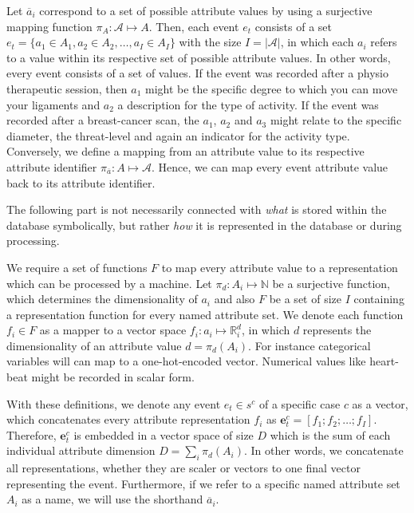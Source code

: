\documentclass[./../../paper.tex]{subfiles}
\begin{document}
Let $\overline{a}_i$ correspond to a set of possible attribute values by using a surjective mapping function $\pi_A : \mathcal{A} \mapsto A$. Then, each event $e_t$ consists of a set $e_t = \{ a_1 \in A_1, a_2 \in A_2, \ldots, a_I \in A_I\}$ with the size $I = |\mathcal{A}|$, in which each $a_i$ refers to a value within its respective set of possible attribute values. In other words, every event consists of a set of values. If the event was recorded after a physio therapeutic session, then $a_1$ might be the specific degree to which you can move your ligaments and $a_2$ a description for the type of activity. If the event was recorded after a breast-cancer scan, the $a_1$, $a_2$ and $a_3$ might relate to the specific diameter, the threat-level and again an indicator for the activity type. 
Conversely, we define a mapping from an attribute value to its respective attribute identifier $\pi_{\overline{a}} : A \mapsto \mathcal{A}$. Hence, we can map every event attribute value back to its attribute identifier. 

The following part is not necessarily connected with \emph{what} is stored within the database symbolically, but rather \emph{how} it is represented in the database or during processing. 

We require a set of functions $F$ to map every attribute value to a representation which can be processed by a machine.
Let $\pi_d : A_i \mapsto \mathbb{N}$ be a surjective function, which determines the dimensionality of $a_i$ and also $F$ be a set of size $I$ containing a representation function for every named attribute set. We denote each function $f_i \in F$ as a mapper to a vector space $f_i : a_i \mapsto \mathbb{R}^d_i$, in which $d$ represents the dimensionality of an attribute value $d = \pi_d(A_i)$. For instance categorical variables will can map to a one-hot-encoded vector. Numerical values like heart-beat might be recorded in scalar form.

With these definitions, we denote any event $e_t \in s^c$ of a specific case $c$ as a vector, which concatenates every attribute representation $f_i$ as $\mathbf{e}_t^{c} = [f_1; f_2; \ldots; f_I]$. Therefore, $\mathbf{e}_t^{c}$ is embedded in a vector space of size $D$ which is the sum of each individual attribute dimension $D = \sum_i \pi_d(A_i)$. In other words, we concatenate all representations, whether they are scaler or vectors to one final vector representing the event. Furthermore, if we refer to a specific named attribute set $A_i$ as a name, we will use the shorthand $\overline{a}_i$. 
\end{document}
